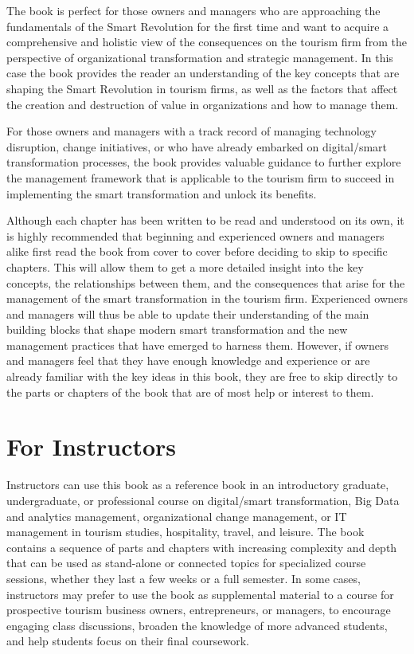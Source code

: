 \documentclass[
  letterpaper,
  DIV=11,
  numbers=noendperiod]{scrreprt}
\begin{document}
The book is perfect for those owners and managers who are approaching
the fundamentals of the Smart Revolution for the first time and want to
acquire a comprehensive and holistic view of the consequences on the
tourism firm from the perspective of organizational transformation and
strategic management. In this case the book provides the reader an
understanding of the key concepts that are shaping the Smart Revolution
in tourism firms, as well as the factors that affect the creation and
destruction of value in organizations and how to manage them.

For those owners and managers with a track record of managing technology
disruption, change initiatives, or who have already embarked on
digital/smart transformation processes, the book provides valuable
guidance to further explore the management framework that is applicable
to the tourism firm to succeed in implementing the smart transformation
and unlock its benefits.

Although each chapter has been written to be read and understood on its
own, it is highly recommended that beginning and experienced owners and
managers alike first read the book from cover to cover before deciding
to skip to specific chapters. This will allow them to get a more
detailed insight into the key concepts, the relationships between them,
and the consequences that arise for the management of the smart
transformation in the tourism firm. Experienced owners and managers will
thus be able to update their understanding of the main building blocks
that shape modern smart transformation and the new management practices
that have emerged to harness them. However, if owners and managers feel
that they have enough knowledge and experience or are already familiar
with the key ideas in this book, they are free to skip directly to the
parts or chapters of the book that are of most help or interest to them.

\hypertarget{for-instructors}{%
\section{For Instructors}\label{for-instructors}}

Instructors can use this book as a reference book in an introductory
graduate, undergraduate, or professional course on digital/smart
transformation, Big Data and analytics management, organizational change
management, or IT management in tourism studies, hospitality, travel,
and leisure. The book contains a sequence of parts and chapters with
increasing complexity and depth that can be used as stand-alone or
connected topics for specialized course sessions, whether they last a
few weeks or a full semester. In some cases, instructors may prefer to
use the book as supplemental material to a course for prospective
tourism business owners, entrepreneurs, or managers, to encourage
engaging class discussions, broaden the knowledge of more advanced
students, and help students focus on their final coursework.
\end{document}
